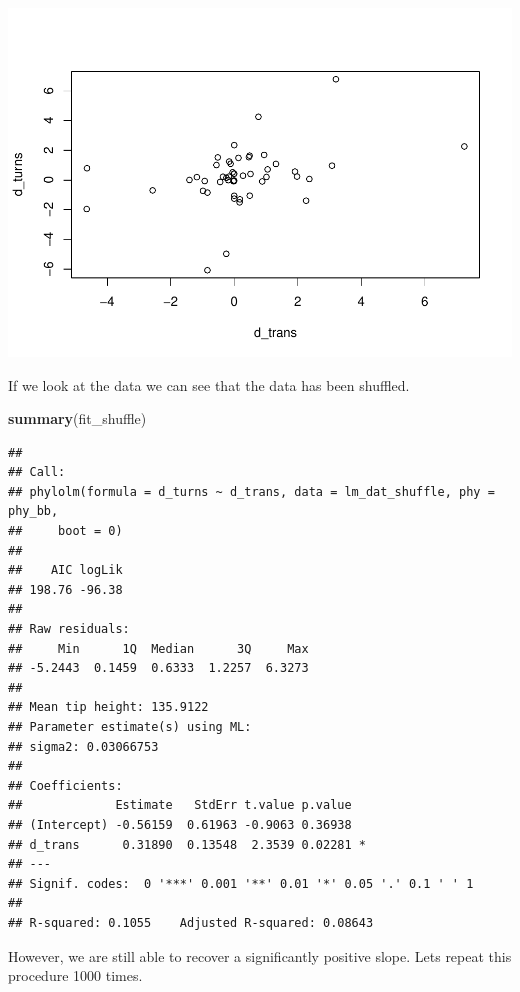 \documentclass[
]{article}
\newenvironment{Shaded}{\begin{snugshade}}{\end{snugshade}}
\newcommand{\FunctionTok}[1]{\textcolor[rgb]{0.13,0.29,0.53}{\textbf{#1}}}
\newcommand{\NormalTok}[1]{#1}
\begin{document}
\includegraphics{SX-regression-distribution_files/figure-latex/unnamed-chunk-8-1.pdf}

If we look at the data we can see that the data has been shuffled.

\begin{Shaded}
\begin{Highlighting}[]
\FunctionTok{summary}\NormalTok{(fit\_shuffle)}
\end{Highlighting}
\end{Shaded}

\begin{verbatim}
## 
## Call:
## phylolm(formula = d_turns ~ d_trans, data = lm_dat_shuffle, phy = phy_bb, 
##     boot = 0)
## 
##    AIC logLik 
## 198.76 -96.38 
## 
## Raw residuals:
##     Min      1Q  Median      3Q     Max 
## -5.2443  0.1459  0.6333  1.2257  6.3273 
## 
## Mean tip height: 135.9122
## Parameter estimate(s) using ML:
## sigma2: 0.03066753 
## 
## Coefficients:
##             Estimate   StdErr t.value p.value  
## (Intercept) -0.56159  0.61963 -0.9063 0.36938  
## d_trans      0.31890  0.13548  2.3539 0.02281 *
## ---
## Signif. codes:  0 '***' 0.001 '**' 0.01 '*' 0.05 '.' 0.1 ' ' 1
## 
## R-squared: 0.1055    Adjusted R-squared: 0.08643
\end{verbatim}

However, we are still able to recover a significantly positive slope.
Lets repeat this procedure 1000 times.
\end{document}
